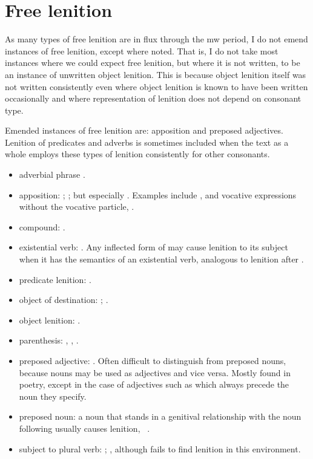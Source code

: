 \section{Free lenition}
\label{sec:free-lenition-1}
As many types of free lenition are in flux through the \gls{mw} period, I do not emend instances of free lenition, except where noted. That is, I do not take most instances where we could expect free lenition,  but where it is not written, to be an instance of \eg unwritten object lenition. This is because object lenition itself was not written consistently even where object lenition is known to have been written occasionally and where representation of lenition does not depend on consonant type.

Emended instances of free lenition are: apposition and preposed adjectives. Lenition of predicates and adverbs is sometimes included when the text as a whole employs these types of lenition consistently for other consonants.
\begin{itemize}
\item adverbial phrase \textcite[§~19, 22]{evans_grammar_1964}.
\item apposition: \textcite[§~19]{evans_grammar_1964}; \textcite[116--9, 122--3]{morgan_y_1952}; but especially \textcite{schrijver_free_2010}. Examples include , and vocative expressions without the vocative particle, \eg {}.
\item compound: \textcite[§~20, 22]{evans_grammar_1964}. 
\item existential verb:  \textcite[29--30]{van_development14}. Any inflected form of  may cause lenition to its subject when it has the semantics of an existential verb, analogous to lenition after .
\item predicate lenition: \textcite[§~21]{evans_grammar_1964}.
\item object of destination: \textcite[227]{morgan_y_1952}; \textcite[§~21]{evans_grammar_1964}. 
\item object lenition: \textcite[§~21]{evans_grammar_1964}.
\item parenthesis: \textcite[429]{morgan_y_1952}, \textcite[§~21]{evans_grammar_1964}, \textcite[5--6]{schrijver_free_2010}.
\item preposed adjective: \textcite[35]{morgan_y_1952}. Often difficult to distinguish from preposed nouns, because nouns may be used as adjectives and vice versa. Mostly found in poetry, except in the case of adjectives such as  which always precede the noun  they specify.
\item preposed noun: a noun that stands in a genitival relationship with the noun following usually causes lenition, \eg {}~\autocite{daniel_cyfuniadau_2003}.
\item subject to plural verb: \textcite[§~21]{evans_grammar_1964}; \textcite[2]{schrijver_free_2010}, although \textcite{van_development14} fails to find lenition in this environment.
\end{itemize}


